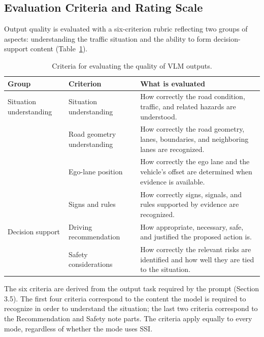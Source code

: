 \documentclass[12pt,a4paper]{report}
\begin{document}
\subsection{Evaluation Criteria and Rating Scale}

Output quality is evaluated with a six-criterion rubric reflecting two groups of aspects: understanding the traffic situation and the ability to form decision-support content (Table~\ref{tab:3.9}).

\begin{table}[H]
    \centering
    \small
    \renewcommand{\arraystretch}{1.25}
    \caption{Criteria for evaluating the quality of VLM outputs.}
    \label{tab:3.9}
    \begin{tabularx}{\linewidth}{
        >{\RaggedRight\arraybackslash}p{3.0cm}
        >{\RaggedRight\arraybackslash}p{3.8cm}
        >{\RaggedRight\arraybackslash}X
    }
        \toprule
        \textbf{Group} & \textbf{Criterion} & \textbf{What is evaluated} \\
        \midrule
        Situation understanding & Situation understanding & How correctly the road condition, traffic, and related hazards are understood. \\
         & Road geometry understanding & How correctly the road geometry, lanes, boundaries, and neighboring lanes are recognized. \\
         & Ego-lane position & How correctly the ego lane and the vehicle's offset are determined when evidence is available. \\
         & Signs and rules & How correctly signs, signals, and rules supported by evidence are recognized. \\
        Decision support & Driving recommendation & How appropriate, necessary, safe, and justified the proposed action is. \\
         & Safety considerations & How correctly the relevant risks are identified and how well they are tied to the situation. \\
        \bottomrule
    \end{tabularx}
\end{table}

The six criteria are derived from the output task required by the prompt (Section 3.5). The first four criteria correspond to the content the model is required to recognize in order to understand the situation; the last two criteria correspond to the Recommendation and Safety note parts. The criteria apply equally to every mode, regardless of whether the mode uses SSI.
\end{document}
